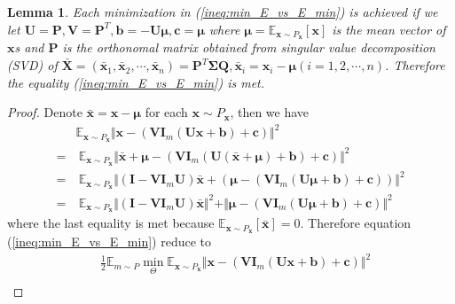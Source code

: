 \documentclass{article}
\newtheorem{lemma}{Lemma}
\begin{document}
    \begin{lemma}
    \label{lm:ae_eq}
    Each minimization in (\ref{ineq:min_E_vs_E_min}) is achieved if we let
    $\mathbf{U} = \mathbf{P}, \mathbf{V} = \mathbf{P}^T, \mathbf{b} = -\mathbf{U}\mathbf{\mu}, \mathbf{c} = \mathbf{\mu}$ where $\mathbf{\mu} = \mathbb{E}_{\mathbf{x} \sim P_\mathbf{x}}[\mathbf{x}]$ is the mean vector of $\mathbf{x}$s and $\mathbf{P}$ is the orthonomal matrix obtained from singular value decomposition (SVD) of $\bar{\mathbf{X}} = (\bar{\mathbf{x}}_1, \bar{\mathbf{x}}_2, \cdots, \bar{\mathbf{x}}_n) = \mathbf{P}^T \mathbf{\Sigma} \mathbf{Q}, \bar{\mathbf{x}}_i = \mathbf{x}_i - \mathbf{\mu} (i=1, 2, \cdots, n)$. Therefore the equality (\ref{ineq:min_E_vs_E_min}) is met.
    \end{lemma}
    \begin{proof}
    Denote $\bar{\mathbf{x}} = \mathbf{x} - \mathbf{\mu}$ for each $\mathbf{x} \sim P_\mathbf{x}$, then we have
    \begin{align}
        &\mathbb{E}_{\mathbf{x} \sim P_\mathbf{x}} \Vert \mathbf{x} - \left( \mathbf{V} \mathbf{I}_m \left( \mathbf{U} \mathbf{x} + \mathbf{b} \right) + \mathbf{c} \right) \Vert^2 \nonumber \\
        =& \ \mathbb{E}_{\mathbf{x}  \sim P_\mathbf{x}} \Vert \bar{\mathbf{x}} + \mathbf{\mu} - \left( \mathbf{V} \mathbf{I}_m \left( \mathbf{U} (\bar{\mathbf{x}} + \mathbf{\mu}) + \mathbf{b} \right) + \mathbf{c} \right) \Vert^2 \nonumber \\
        =& \ \mathbb{E}_{\mathbf{x} \sim P_\mathbf{x}} \Vert (\mathbf{I} - \mathbf{V} \mathbf{I}_m \mathbf{U}) \bar{\mathbf{x}} +  (\mathbf{\mu} - \left( \mathbf{V} \mathbf{I}_m \left( \mathbf{U} \mathbf{\mu} + \mathbf{b} \right) + \mathbf{c} \right)) \Vert^2 \nonumber \\
        =& \ \mathbb{E}_{\mathbf{x} \sim P_\mathbf{x}} \Vert (\mathbf{I} - \mathbf{V} \mathbf{I}_m \mathbf{U}) \bar{\mathbf{x}} \Vert^2 + \Vert   \mathbf{\mu} - \left( \mathbf{V} \mathbf{I}_m \left( \mathbf{U} \mathbf{\mu} + \mathbf{b} \right) + \mathbf{c} \right) \Vert^2 \nonumber  
    \end{align}
    where the last equality is met because $\mathbb{E}_{\mathbf{x} \sim P_\mathbf{x}}[\bar{\mathbf{x}}] = 0$. Therefore equation (\ref{ineq:min_E_vs_E_min}) reduce to
    \begin{align}
        &\frac{1}{2} \mathbb{E}_{m \sim P} \min_{\Theta}  \mathbb{E}_{\mathbf{x} \sim P_\mathbf{x}} \Vert \mathbf{x} - \left( \mathbf{V} \mathbf{I}_m \left( \mathbf{U} \mathbf{x} + \mathbf{b} \right) + \mathbf{c} \right) \Vert^2 \nonumber \\

\end{align}
\end{proof}
\end{document}
